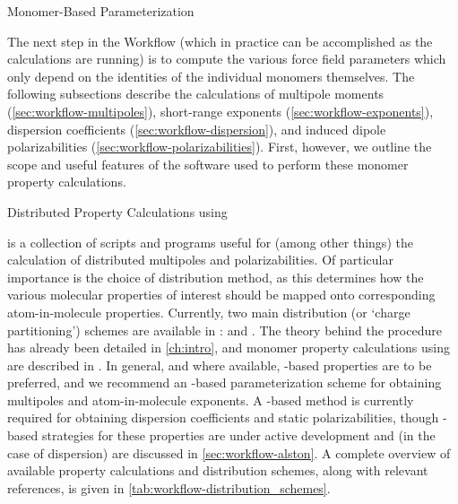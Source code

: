 \begin{section}{Monomer-Based Parameterization}
\label{sec:workflow-monomer_parameters}

The next step in the Workflow
(which in practice can be accomplished as the \dftsapt calculations are
running)
is to compute the various force field parameters which only depend on the
identities of the individual monomers themselves. The following subsections describe the
calculations of multipole moments (\cref{sec:workflow-multipoles}),
short-range exponents (\cref{sec:workflow-exponents}), dispersion coefficients
(\cref{sec:workflow-dispersion}), and induced dipole polarizabilities
(\cref{sec:workflow-polarizabilities}). First, however, we 
outline the scope and useful features of the \camcasp software used to
perform these monomer property calculations.

\begin{subsection}{Distributed Property Calculations using \camcasp}

\camcasp is a collection of scripts and programs useful for (among other
things) the calculation of distributed multipoles and
polarizabilities.\cite{camcasp5.8} Of particular importance is the
choice of distribution method, as this determines how the various molecular properties
of interest should be mapped onto corresponding atom-in-molecule properties. Currently, two
main distribution (or `charge partitioning') schemes are available in \camcasp:
\dma\cite{Stone2005} and
\isa.\cite{Misquitta2014} The theory behind the \isa procedure has already been detailed in
\cref{ch:intro}, and monomer property calculations using \dma are
described in 
. In general, and where
available, \isa-based properties are to be preferred, and we recommend an
\isa-based parameterization scheme for obtaining multipoles and
atom-in-molecule exponents. A \dma-based method is currently required for
obtaining dispersion coefficients and static polarizabilities, though
\isa-based strategies for these properties are under active development and
(in the case of dispersion) are discussed in \cref{sec:workflow-alston}.
A complete overview of
available property calculations and distribution schemes, along with relevant references,
is given in \cref{tab:workflow-distribution_schemes}.



\end{subsection}
\end{section}
